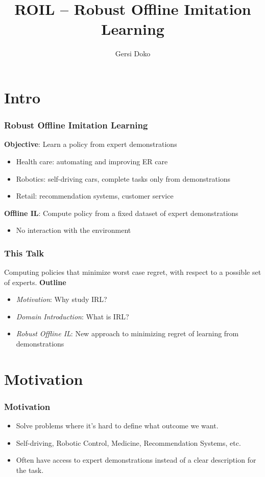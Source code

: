 \documentclass{beamer}
\title{ROIL -- Robust Offline Imitation Learning}
\author{Gersi Doko}
\institute{Department of Computer Science \\ University of New Hampshire}
\begin{document}
\frame{\titlepage}

\section*{Intro}

\begin{frame}
	\frametitle{Robust Offline Imitation Learning}
	\textbf{Objective}: Learn a policy from expert demonstrations
	\begin{itemize}
	\item Health care: automating and improving ER care
	\item Robotics: self-driving cars, complete tasks only from demonstrations
	\item Retail: recommendation systems, customer service
	
	\end{itemize}
	\vfill
	\textbf{Offline IL}: Compute policy from a fixed dataset of expert demonstrations
	\begin{itemize}
		\item No interaction with the environment
	\end{itemize}
\end{frame}

\begin{frame}
	\frametitle{This Talk}
	Computing policies that minimize worst case regret, with respect to a possible set of experts.
	\vfill
	\textbf{Outline}
	\begin{itemize}
	\item \emph{Motivation}: Why study IRL?
	\item \emph{Domain Introduction}: What is IRL?
	\item \emph{Robust Offline IL}: New approach to minimizing regret of learning from demonstrations
	\end{itemize}
\end{frame}

\section*{Motivation}

\begin{frame}
\frametitle{Motivation}
	\begin{itemize}
		\item Solve problems where it's hard to define what outcome we want.
		\item Self-driving, Robotic Control, Medicine, Recommendation Systems, etc.
		\item Often have access to expert demonstrations instead of a clear description for the task.
	\end{itemize}
\end{frame}
\end{document}
